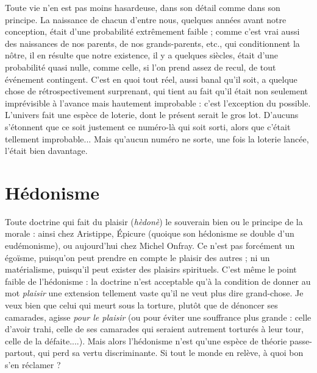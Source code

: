Toute vie n’en est pas moins hasardeuse, dans son détail comme dans son
principe. La naissance de chacun d’entre nous, quelques années avant notre
conception, était d’une probabilité extrêmement faible ; comme c’est vrai aussi
des naissances de nos parents, de nos grands-parents, etc., qui conditionnent la
nôtre, il en résulte que notre existence, il y a quelques siècles, était d’une probabilité
quasi nulle, comme celle, si l’on prend assez de recul, de tout événement
contingent. C’est en quoi tout réel, aussi banal qu’il soit, a quelque chose
de rétrospectivement surprenant, qui tient au fait qu’il était non seulement
imprévisible à l’avance mais hautement improbable : c’est l’exception du possible.
L'univers fait une espèce de loterie, dont le présent serait le gros lot.
D’aucuns s’étonnent que ce soit justement ce numéro-là qui soit sorti, alors
que c'était tellement improbable... Mais qu'aucun numéro ne sorte, une fois la
loterie lancée, l'était bien davantage.

\section{Hédonisme}
Toute doctrine qui fait du plaisir ({\it hèdonè}) le souverain bien
ou le principe de la morale : ainsi chez Aristippe, Épicure
(quoique son hédonisme se double d’un eudémonisme), ou aujourd’hui chez
Michel Onfray. Ce n’est pas forcément un égoïsme, puisqu'on peut prendre en
compte le plaisir des autres ; ni un matérialisme, puisqu'il peut exister des plaisirs
spirituels. C’est même le point faible de l’hédonisme : la doctrine n’est
acceptable qu’à la condition de donner au mot {\it plaisir} une extension tellement
vaste qu’il ne veut plus dire grand-chose. Je veux bien que celui qui meurt sous
la torture, plutôt que de dénoncer ses camarades, agisse {\it pour le plaisir} (ou pour
éviter une souffrance plus grande : celle d’avoir trahi, celle de ses camarades qui
seraient autrement torturés à leur tour, celle de la défaite....). Mais alors l’hédonisme
n’est qu’une espèce de théorie passe-partout, qui perd sa vertu discriminante.
Si tout le monde en relève, à quoi bon s’en réclamer ?

